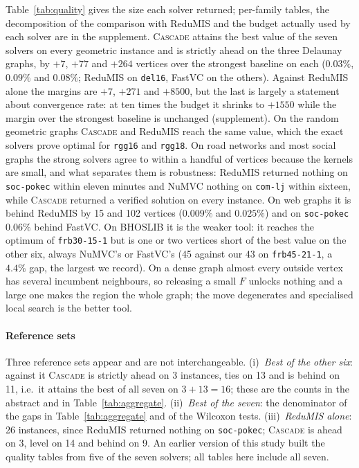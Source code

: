 \documentclass[review,authoryear,11pt]{elsarticle}
\theoremstyle{definition}
\begin{document}
Table~\ref{tab:quality} gives the size each solver returned; per-family tables, the
decomposition of the comparison with ReduMIS and the budget actually used by each
solver are in the supplement. \textsc{Cascade} attains the best value of the seven
solvers on every geometric instance and is strictly ahead on the three Delaunay
graphs, by $+7$, $+77$ and $+264$ vertices over the strongest baseline on each
($0.03\%$, $0.09\%$ and $0.08\%$; ReduMIS on \texttt{del16}, FastVC on the others). Against
ReduMIS alone the margins are $+7$, $+271$ and $+8500$, but the last is largely a
statement about convergence rate: at ten times the budget it shrinks to $+1550$ while
the margin over the strongest baseline is unchanged (supplement). On the random
geometric graphs \textsc{Cascade} and ReduMIS reach the same value, which the exact
solvers prove optimal for \texttt{rgg16} and \texttt{rgg18}. On road networks and most
social graphs the strong solvers agree to within a handful of vertices because the
kernels are small, and what separates them is robustness: ReduMIS returned nothing on
\texttt{soc-pokec} within eleven minutes and NuMVC nothing on \texttt{com-lj} within
sixteen, while \textsc{Cascade} returned a verified solution on every instance. On web
graphs it is behind ReduMIS by 15 and 102 vertices ($0.009\%$ and $0.025\%$) and on
\texttt{soc-pokec} $0.06\%$ behind FastVC. On BHOSLIB it is the weaker tool: it reaches
the optimum of \texttt{frb30-15-1} but is one or two vertices short of the best value
on the other six, always NuMVC's or FastVC's (45 against our 43 on
\texttt{frb45-21-1}, a $4.4\%$ gap, the largest we record). On a dense graph almost
every outside vertex has several incumbent neighbours, so releasing a small $F$
unlocks nothing and a large one makes the region the whole graph; the move degenerates
and specialised local search is the better tool.

\paragraph{Reference sets} Three reference sets appear and are not interchangeable.
(i)~\emph{Best of the other six}: against it \textsc{Cascade} is strictly ahead on 3
instances, ties on 13 and is behind on 11, i.e.\ it attains the best of all seven on
$3+13=16$; these are the counts in the abstract and in Table~\ref{tab:aggregate}.
(ii)~\emph{Best of the seven}: the denominator of the gaps in Table~\ref{tab:aggregate}
and of the Wilcoxon tests. (iii)~\emph{ReduMIS alone}: 26 instances, since ReduMIS
returned nothing on \texttt{soc-pokec}; \textsc{Cascade} is ahead on 3, level on 14
and behind on 9. An earlier version of this study built the quality tables from five of
the seven solvers; all tables here include all seven.
\end{document}
